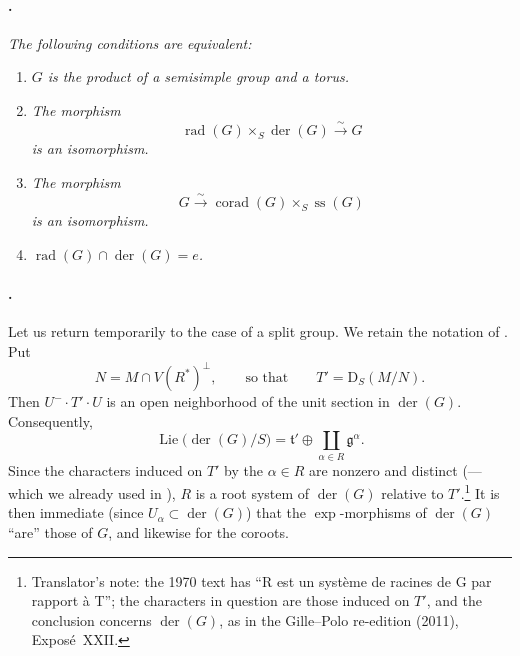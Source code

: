 \paragraph{.}
\textit{The following conditions are equivalent:}
\begin{enumerate}
\item[\textup{(i)}]
\textit{\(G\) is the product of a semisimple group and a torus.}

\item[\textup{(ii)}]
\textit{The morphism}
\[
  \operatorname{rad}(G)\times_S\operatorname{der}(G)
  \xrightarrow{\ \sim\ }G
\]
\textit{is an isomorphism.}

\item[\textup{(iii)}]
\textit{The morphism}
\[
  G\xrightarrow{\ \sim\ }
  \operatorname{corad}(G)\times_S\operatorname{ss}(G)
\]
\textit{is an isomorphism.}

\item[\textup{(iv)}]
\textit{\(\operatorname{rad}(G)\cap\operatorname{der}(G)=e\).}
\end{enumerate}

\paragraph{.}
Let us return temporarily to the case of a split group. We retain
the notation of . Put
\[
  N=M\cap V(R^*)^\perp,
  \qquad\text{so that}\qquad
  T'=\mathrm D_S(M/N).
\]
Then \(U^-\cdot T'\cdot U\) is an open neighborhood of the unit
section in \(\operatorname{der}(G)\). Consequently,
\[
  \operatorname{Lie}\bigl(\operatorname{der}(G)/S\bigr)
  =
  \mathfrak t'\oplus
  \coprod_{\alpha\in R}\mathfrak g^\alpha.
\]
Since the characters induced on \(T'\) by the
\(\alpha\in R\) are nonzero and distinct
\textup{(---which we already used in )},
\(R\) is a root system of \(\operatorname{der}(G)\) relative to
\(T'\).\footnote{Translator's note: the 1970 text has ``R est un système de
racines de G par rapport à T''; the characters in question are those induced
on \(T'\), and the conclusion concerns \(\operatorname{der}(G)\), as in the
Gille--Polo re-edition (2011), Exposé~XXII.} It is then immediate \textup{(since
\(U_\alpha\subset\operatorname{der}(G)\))} that the
\(\exp\)-morphisms of \(\operatorname{der}(G)\) ``are'' those of
\(G\), and likewise for the coroots.

